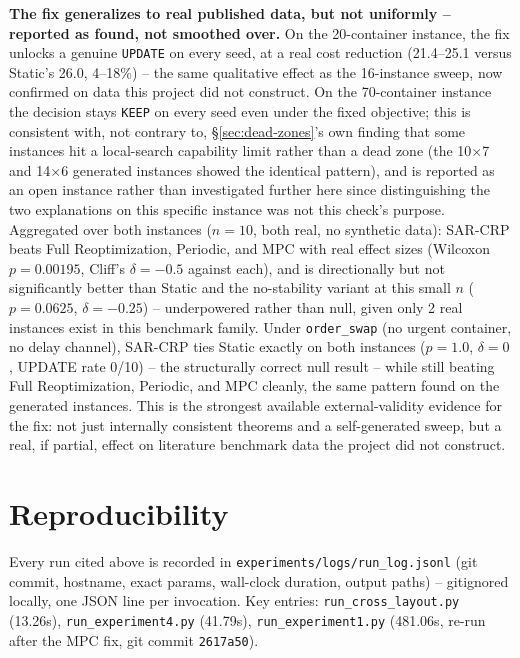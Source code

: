 \documentclass[11pt]{article}
\begin{document}
\textbf{The fix generalizes to real published data, but not uniformly --
reported as found, not smoothed over.} On the 20-container instance, the
fix unlocks a genuine \texttt{UPDATE} on every seed, at a real cost
reduction (21.4--25.1 versus Static's 26.0, 4--18\%) -- the same
qualitative effect as the 16-instance sweep, now confirmed on data this
project did not construct. On the 70-container instance the decision
stays \texttt{KEEP} on every seed even under the fixed objective; this is
consistent with, not contrary to, \S\ref{sec:dead-zones}'s own finding
that some instances hit a local-search capability limit rather than a
dead zone (the 10$\times$7 and 14$\times$6 generated instances showed the
identical pattern), and is reported as an open instance rather than
investigated further here since distinguishing the two explanations on
this specific instance was not this check's purpose. Aggregated over
both instances ($n=10$, both real, no synthetic data): SAR-CRP beats Full
Reoptimization, Periodic, and MPC with real effect sizes (Wilcoxon
$p=0.00195$, Cliff's $\delta=-0.5$ against each), and is directionally
but not significantly better than Static and the no-stability variant at
this small $n$ ($p=0.0625$, $\delta=-0.25$) -- underpowered rather than
null, given only 2 real instances exist in this benchmark family. Under
\texttt{order\_swap} (no urgent container, no delay channel), SAR-CRP
ties Static exactly on both instances ($p=1.0$, $\delta=0$, UPDATE rate
0/10) -- the structurally correct null result -- while still beating
Full Reoptimization, Periodic, and MPC cleanly, the same pattern found on
the generated instances. This is the strongest available external-validity
evidence for the fix: not just internally consistent theorems and a
self-generated sweep, but a real, if partial, effect on literature
benchmark data the project did not construct.

\section{Reproducibility}
\label{sec:reproducibility}

Every run cited above is recorded in
\texttt{experiments/logs/run\_log.jsonl} (git commit, hostname, exact
params, wall-clock duration, output paths) -- gitignored locally, one JSON
line per invocation. Key entries: \texttt{run\_cross\_layout.py}
(13.26s), \texttt{run\_experiment4.py} (41.79s),
\texttt{run\_experiment1.py} (481.06s, re-run after the MPC
fix, git commit \texttt{2617a50}).
\end{document}
